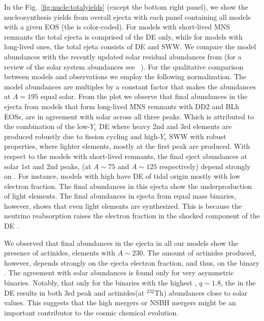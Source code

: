 In the Fig.~\ref{fig:nucle:totalyields} (except the bottom right panel), 
we show the nucleosynthesis yields from overall ejecta with each panel 
containing all models with a given \ac{EOS} (the \mr{} is color-coded).
For models with short-lived \ac{MNS} remnants the total ejecta is comprised 
of the \ac{DE} only, while for models with long-lived ones, the total ejeta 
consists of \ac{DE} and \ac{SWW}. 
%
We compare the model abundances with the recently updated solar residual 
\rproc{} abundances from \citet{Prantzos2020} 
(for a review of the solar system abundances see \eg~\citet{Pritychenko:2019xvf}).
%
For the qualitative comparison between models and observations we employ 
the following normalization. 
The model abundances are multiples by a constant factor that makes the abundances at 
$A=195$ equal solar.
%
From the plot we observe that final \rproc{} abundances in the ejecta from models that 
form long-lived \ac{MNS} remnants with DD2 and BLh \acp{EOS}, are in agreement with 
solar across all three \rproc{} peaks. 
Which is attributed to the combination of the low-$Y_e$ \ac{DE} where heavy 
$2$nd and $3$rd \rproc{} elements are produced robustly due to fission cycling 
and high-$Y_e$ \ac{SWW} with robust properties, where lighter elements, mostly at the 
first peak are produced. 
%
With respect to the models with short-lived remnants, the final \rproc{} eject abundances 
at solar $1$st and $2$nd \rproc{} peaks, (at $A\sim 75$ and $A\sim 125$ respectively) 
depend strongly on \mr{}. 
For instance, models with high \mr{} have \ac{DE} of tidal origin mostly with low 
electron fraction. The final \rproc{} abundances in this ejecta show the underproduction 
of light elements. 
The final abundances in ejecta from equal mass binaries, 
however, shows that even light \rproc{} elements are 
synthesized. This is because the neutrino reabsorption raises the electron fraction 
in the shocked component of the \ac{DE} \citep{Wanajo:2014wha,Radice:2018pdn}. 

We observed that final abundances in the ejecta in all our models show the 
presence of actinides, elements with $A\sim230$. 
The amount of actinides produced, however, depends strongly on the ejecta 
electron fraction, and thus, on the binary \mr{}.
The agreement with solar abundances is found only for very asymmetric binaries. 
Notably, that only for the binaries with the highest \mr{}, $q\sim1.8$, the 
\rproc{} in the \ac{DE} results in both $3$rd peak and actinides(at $^{232}$Th) abundances 
close to solar values. 
This suggests that the high \mr{} mergers or \ac{NSBH} mergers might be an 
important contributor to the cosmic chemical evolution.

